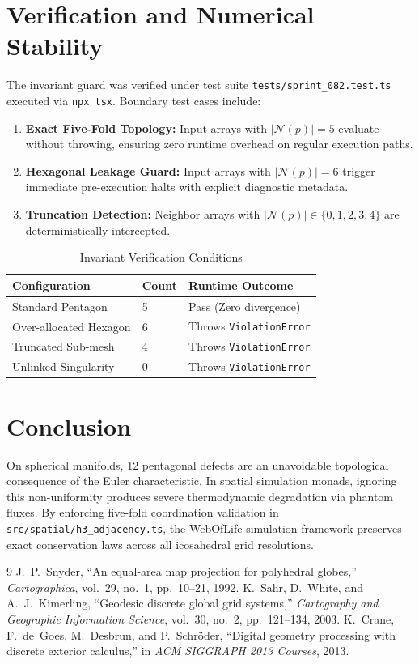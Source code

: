 \documentclass[10pt,twocolumn,letterpaper]{article}
\theoremstyle{definition}
\begin{document}
\section{Verification and Numerical Stability}

The invariant guard was verified under test suite \texttt{tests/sprint\_082.test.ts} executed via \texttt{npx tsx}. Boundary test cases include:
\begin{enumerate}
    \item \textbf{Exact Five-Fold Topology:} Input arrays with $|\mathcal{N}(p)| = 5$ evaluate without throwing, ensuring zero runtime overhead on regular execution paths.
    \item \textbf{Hexagonal Leakage Guard:} Input arrays with $|\mathcal{N}(p)| = 6$ trigger immediate pre-execution halts with explicit diagnostic metadata.
    \item \textbf{Truncation Detection:} Neighbor arrays with $|\mathcal{N}(p)| \in \{0, 1, 2, 3, 4\}$ are deterministically intercepted.
\end{enumerate}

\begin{table}[h]
\centering
\caption{Invariant Verification Conditions}
\label{tab:invariants}
\begin{tabular}{@{}lll@{}}
\toprule
\textbf{Configuration} & \textbf{Count} & \textbf{Runtime Outcome} \\
\midrule
Standard Pentagon & 5 & Pass (Zero divergence) \\
Over-allocated Hexagon & 6 & Throws \texttt{ViolationError} \\
Truncated Sub-mesh & 4 & Throws \texttt{ViolationError} \\
Unlinked Singularity & 0 & Throws \texttt{ViolationError} \\
\bottomrule
\end{tabular}
\end{table}

\section{Conclusion}
On spherical manifolds, 12 pentagonal defects are an unavoidable topological consequence of the Euler characteristic. In spatial simulation monads, ignoring this non-uniformity produces severe thermodynamic degradation via phantom fluxes. By enforcing five-fold coordination validation in \texttt{src/spatial/h3\_adjacency.ts}, the WebOfLife simulation framework preserves exact conservation laws across all icosahedral grid resolutions.

\begin{thebibliography}{9}
J.~P.~Snyder, ``An equal-area map projection for polyhedral globes,'' \emph{Cartographica}, vol.~29, no.~1, pp.~10--21, 1992.
K.~Sahr, D.~White, and A.~J.~Kimerling, ``Geodesic discrete global grid systems,'' \emph{Cartography and Geographic Information Science}, vol.~30, no.~2, pp.~121--134, 2003.
K.~Crane, F.~de~Goes, M.~Desbrun, and P.~Schr\"oder, ``Digital geometry processing with discrete exterior calculus,'' in \emph{ACM SIGGRAPH 2013 Courses}, 2013.
\end{thebibliography}
\end{document}
